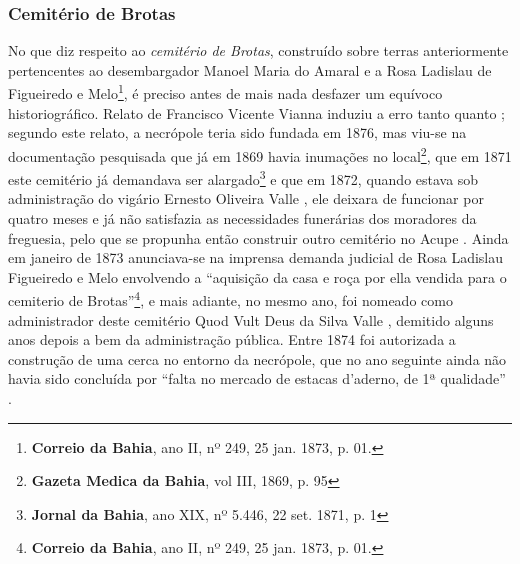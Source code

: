 \subsubsection{Cemitério de Brotas}\label{subsubsec:cemitbro}

No que diz respeito ao \textit{cemitério de Brotas}, construído sobre terras anteriormente pertencentes ao desembargador Manoel Maria do Amaral \cite[relatório da inspetoria de higiene, p.~23]{bahia_rpe_1893} e a Rosa Ladislau de Figueiredo e Melo\footnote{\textbf{Correio da Bahia}, ano II, nº 249, 25 jan. 1873, p. 01.}, é preciso antes de mais nada desfazer um equívoco historiográfico. Relato de Francisco Vicente Vianna \cite[p.~371]{vianna_bahia_1893} induziu a erro tanto  quanto ; segundo este relato, a necrópole teria sido fundada em 1876, mas viu-se na documentação pesquisada que já em 1869 havia inumações no local\footnote{\textbf{Gazeta Medica da Bahia}, vol III, 1869, p. 95}, que em 1871 este cemitério já demandava ser alargado\footnote{\textbf{Jornal da Bahia}, ano XIX, nº 5.446, 22 set. 1871, p. 1} e que em 1872, quando estava sob administração do vigário Ernesto Oliveira Valle \cite[segunda~parte, p.~105]{pimenta_almanak_1872}, ele deixara de funcionar por quatro meses e já não satisfazia as necessidades funerárias dos moradores da freguesia, pelo que se propunha então construir outro cemitério no Acupe \cite[relatório do chefe de polícia, p.~12]{bahia_1872}. Ainda em janeiro de 1873 anunciava-se na imprensa demanda judicial de Rosa Ladislau Figueiredo e Melo envolvendo a ``aquisição da casa e roça por ella vendida para o cemiterio de Brotas''\footnote{\textbf{Correio da Bahia}, ano II, nº 249, 25 jan. 1873, p. 01.}, e mais adiante, no mesmo ano, foi nomeado como administrador deste cemitério Quod Vult Deus da Silva Valle \cite[p.~39]{bahia_rpe_1873a}, demitido alguns anos depois a bem da administração pública. Entre 1874 foi autorizada a construção de uma cerca no entorno da necrópole, que no ano seguinte ainda não havia sido concluída por ``falta no mercado de estacas d'aderno, de 1ª qualidade'' \cite{bahia_rpe_1874,bahia_rpe_1875}.

